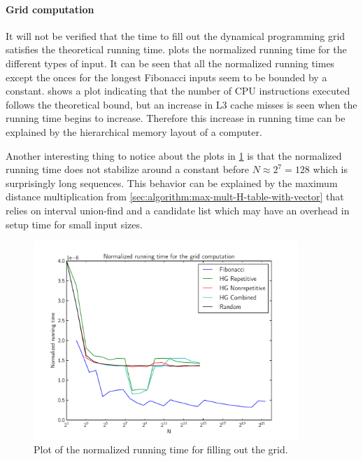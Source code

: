 \documentclass[twoside,11pt,openright]{report}
\begin{document}
\paragraph{Grid computation}
It will not be verified that the time to fill out the dynamical programming grid satisfies the theoretical running time.  plots the normalized running time for the different types of input. It can be seen that all the normalized running times except the onces for the longest Fibonacci inputs seem to be bounded by a constant.  shows a plot indicating that the number of CPU instructions executed follows the theoretical bound, but an increase in L3 cache misses is seen when the running time begins to increase. Therefore this increase in running time can be explained by the hierarchical memory layout of a computer.

Another interesting thing to notice about the plots in \cref{fig:benchmark:fill-grid-time} is that the normalized running time does not stabilize around a constant before $N \approx 2^7 = 128$ which is surprisingly long sequences. This behavior can be explained by the maximum distance multiplication from \cref{sec:algorithm:max-mult-H-table-with-vector} that relies on interval union-find and a candidate list which may have an overhead in setup time for small input sizes.

\begin{figure}[!htb]
  \centering
  \includegraphics[width=10cm]{combined/grid_runningtime}
  \caption{Plot of the normalized running time for filling out the grid.}
  \label{fig:benchmark:fill-grid-time}
\end{figure}
\end{document}
